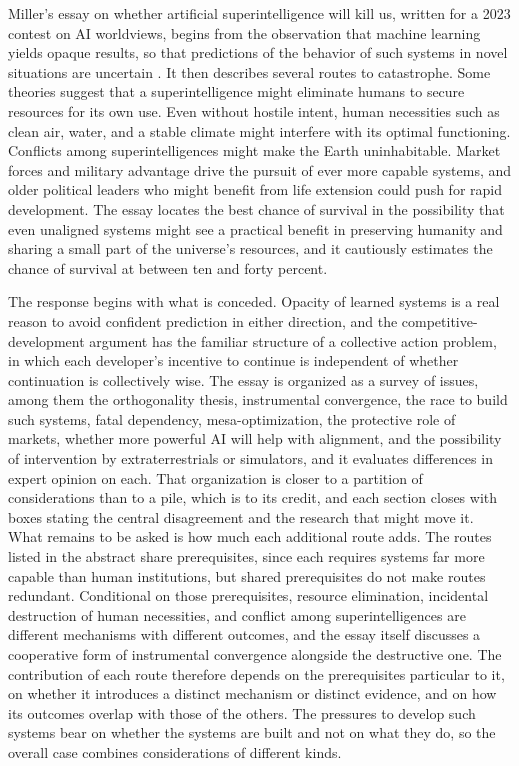 \documentclass[11pt]{article}
\begin{document}
Miller's essay on whether artificial superintelligence will kill us, written for a 2023 contest on AI worldviews, begins from the observation that machine learning yields opaque results, so that predictions of the behavior of such systems in novel situations are uncertain \citep{miller2023}. It then describes several routes to catastrophe. Some theories suggest that a superintelligence might eliminate humans to secure resources for its own use. Even without hostile intent, human necessities such as clean air, water, and a stable climate might interfere with its optimal functioning. Conflicts among superintelligences might make the Earth uninhabitable. Market forces and military advantage drive the pursuit of ever more capable systems, and older political leaders who might benefit from life extension could push for rapid development. The essay locates the best chance of survival in the possibility that even unaligned systems might see a practical benefit in preserving humanity and sharing a small part of the universe's resources, and it cautiously estimates the chance of survival at between ten and forty percent.

The response begins with what is conceded. Opacity of learned systems is a real reason to avoid confident prediction in either direction, and the competitive-development argument has the familiar structure of a collective action problem, in which each developer's incentive to continue is independent of whether continuation is collectively wise. The essay is organized as a survey of issues, among them the orthogonality thesis, instrumental convergence, the race to build such systems, fatal dependency, mesa-optimization, the protective role of markets, whether more powerful AI will help with alignment, and the possibility of intervention by extraterrestrials or simulators, and it evaluates differences in expert opinion on each. That organization is closer to a partition of considerations than to a pile, which is to its credit, and each section closes with boxes stating the central disagreement and the research that might move it. What remains to be asked is how much each additional route adds. The routes listed in the abstract share prerequisites, since each requires systems far more capable than human institutions, but shared prerequisites do not make routes redundant. Conditional on those prerequisites, resource elimination, incidental destruction of human necessities, and conflict among superintelligences are different mechanisms with different outcomes, and the essay itself discusses a cooperative form of instrumental convergence alongside the destructive one. The contribution of each route therefore depends on the prerequisites particular to it, on whether it introduces a distinct mechanism or distinct evidence, and on how its outcomes overlap with those of the others. The pressures to develop such systems bear on whether the systems are built and not on what they do, so the overall case combines considerations of different kinds.
\end{document}
